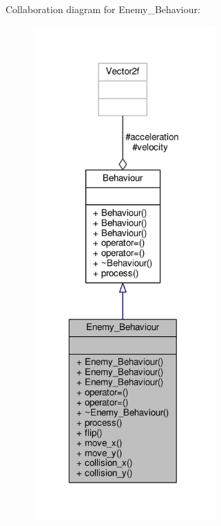 Collaboration diagram for Enemy\+\_\+\+Behaviour\+:\nopagebreak
\begin{figure}[H]
\begin{center}
\leavevmode
\includegraphics[width=199pt]{classEnemy__Behaviour__coll__graph}
\end{center}
\end{figure}
